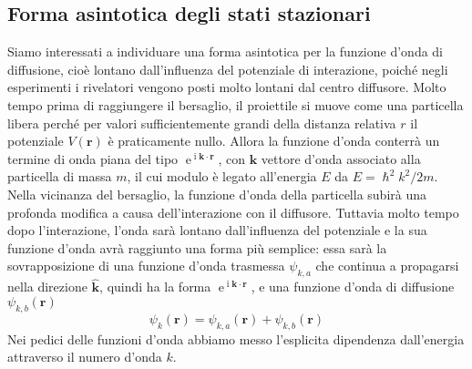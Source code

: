 \documentclass[a4paper,fleqn,twoside,12pt]{article}
\DeclareMathOperator{\e}{\mathrm{e}} %
\DeclareMathOperator{\uimm}{\mathrm{i}} %
\newcommand*{\versor}[1]{\hat{\bm{#1}}}
\begin{document}
\subsection{Forma asintotica degli stati stazionari}
\label{sec:forma-asintintotica}

Siamo interessati a individuare una forma asintotica per la funzione d'onda di
diffusione, cioè lontano dall'influenza del potenziale di interazione, poiché
negli esperimenti i rivelatori vengono posti molto lontani dal centro diffusore.
Molto tempo prima di raggiungere il bersaglio, il proiettile si muove come una
particella libera perché per valori sufficientemente grandi della distanza
relativa $r$ il potenziale $V(\bm{r})$ è praticamente nullo.  Allora la funzione
d'onda conterrà un termine di onda piana del tipo
$\e^{\uimm \bm{k}\cdot\bm{r}}$, con $\bm{k}$ vettore d'onda associato alla
particella di massa $m$, il cui modulo è legato all'energia $E$ da
$E = \hslash^{2}k^{2}/2m$.  Nella vicinanza del bersaglio, la funzione d'onda
della particella subirà una profonda modifica a causa dell'interazione con il
diffusore.  Tuttavia molto tempo dopo l'interazione, l'onda sarà lontano
dall'influenza del potenziale e la sua funzione d'onda avrà raggiunto una forma
più semplice: essa sarà la sovrapposizione di una funzione d'onda trasmessa
$\psi_{k,a}$ che continua a propagarsi nella direzione $\versor{k}$, quindi ha
la forma $\e^{\uimm \bm{k}\cdot\bm{r}}$, e una funzione d'onda di diffusione
$\psi_{k,b}(\bm{r})$
\begin{equation}
  \psi_{k}(\bm{r}) = \psi_{k,a}(\bm{r}) + \psi_{k,b}(\bm{r})
\end{equation}
Nei pedici delle funzioni d'onda abbiamo messo l'esplicita dipendenza
dall'energia attraverso il numero d'onda $k$.
\end{document}
